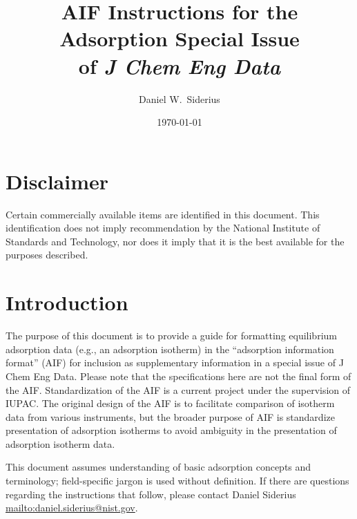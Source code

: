 \documentclass[preprint,pre,showkeys,12pt,superscriptaddress,nofootinbib,endfloats*]{revtex4-1}
\begin{document}
\title{AIF Instructions for the Adsorption Special Issue\\of {\it J Chem Eng Data}
} 

\author{Daniel W.~Siderius}


\date{\today}


\maketitle

\newpage
\section*{Disclaimer}

Certain commercially available items are identified in this document. This identification does not imply recommendation by the National Institute of Standards and Technology, nor does it imply that it is the best available for the purposes described.

\section{Introduction}\label{sec:intro}

The purpose of this document is to provide a guide for formatting equilibrium adsorption data (e.g., an adsorption isotherm) in the ``adsorption information format'' (AIF) for inclusion as supplementary information in a special issue of J Chem Eng Data. Please note that the specifications here are not the final form of the AIF. Standardization of the AIF is a current project under the supervision of IUPAC. The original design of the AIF is to facilitate comparison of isotherm data from various instruments, but the broader purpose of AIF is standardize presentation of adsorption isotherms to avoid ambiguity in the presentation of adsorption isotherm data.

This document assumes understanding of basic adsorption concepts and terminology; field-specific jargon is used without definition. If there are questions regarding the instructions that follow, please contact Daniel Siderius \url{mailto:daniel.siderius@nist.gov}.
\end{document}
